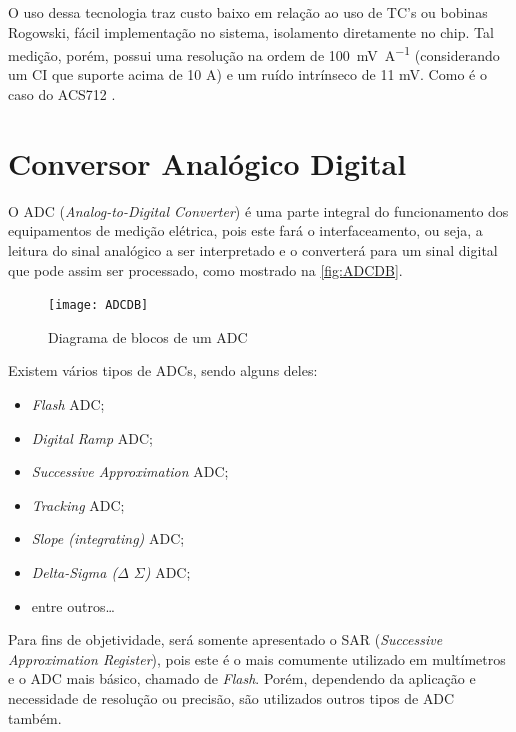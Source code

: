 O uso dessa tecnologia traz custo baixo em relação ao uso de TC's ou bobinas Rogowski, fácil implementação no sistema, isolamento diretamente no chip. Tal medição, porém, possui uma resolução na ordem de \SI{100}{\milli\volt\per\ampere} (considerando um CI que suporte acima de 10 A) e um ruído intrínseco de 11 mV. Como é o caso do ACS712 \citep{acs712}.

\section{Conversor Analógico Digital}\label{sec:ADC}

O \gls{ADC} (\textit{Analog-to-Digital Converter}) é uma parte integral do funcionamento dos equipamentos de medição elétrica, pois este fará o interfaceamento, ou seja, a leitura do sinal analógico a ser interpretado e o converterá para um sinal digital que pode assim ser processado, como mostrado na \autoref{fig:ADCDB}.

\begin{figure}[htb!]%
    \caption{Diagrama de blocos de um ADC}%
    \label{fig:ADCDB}%
    \texttt{[image: ADCDB]}%
\end{figure}

Existem vários tipos de \gls{ADC}s, sendo alguns deles:

\begin{itemize}
    \item \textit{Flash} \gls{ADC};
    \item \textit{Digital Ramp} \gls{ADC};
    \item \textit{Successive Approximation} \gls{ADC};
    \item \textit{Tracking} \gls{ADC};
    \item \textit{Slope (integrating)} \gls{ADC};
    \item \textit{Delta-Sigma ($\Delta$ $\Sigma$)} \gls{ADC};
    \item entre outros\dots
\end{itemize}

Para fins de objetividade, será somente apresentado o \gls{SAR} (\textit{Successive Approximation Register}), pois este é o mais comumente utilizado em multímetros e o \gls{ADC} mais básico, chamado de \textit{Flash}. Porém, dependendo da aplicação e necessidade de resolução ou precisão, são utilizados outros tipos de \gls{ADC} também.

